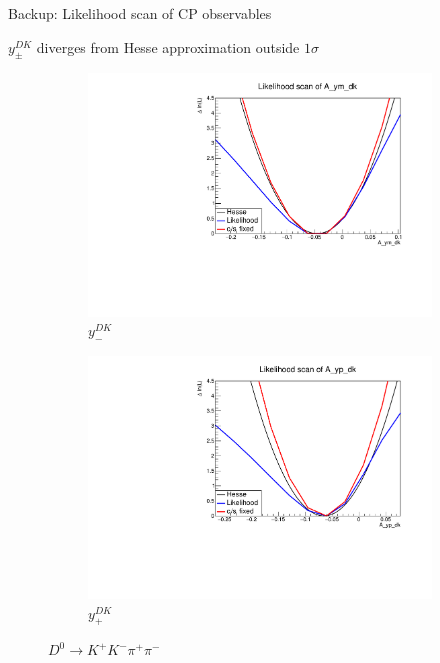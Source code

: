 \documentclass[xcolor={dvipsnames}]{beamer}
\begin{document}
\begin{frame}{Backup: Likelihood scan of CP observables}
  \begin{center}
    $y_\pm^{DK}$ diverges from Hesse approximation outside $1\sigma$
  \end{center}
  \begin{figure}
    \centering
    \begin{subfigure}{0.5\textwidth}
      \centering
      \includegraphics[width=1.0\textwidth]{Plots/A_ym_dk_likelihood_scan_KKpipi.pdf}
      \vspace{-0.3cm}
      \caption*{$y_-^{DK}$}
    \end{subfigure}%
    \begin{subfigure}{0.5\textwidth}
      \centering
      \includegraphics[width=1.0\textwidth]{Plots/A_yp_dk_likelihood_scan_KKpipi.pdf}
      \vspace{-0.3cm}
      \caption*{$y_+^{DK}$}
    \end{subfigure}
    \caption*{$D^0\to K^+K^-\pi^+\pi^-$}
  \end{figure}
\end{frame}
\end{document}
